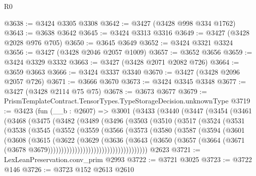 \begin{lexlean}{R0}
\begin{coremodule}
@3638 := @3424 @3305 @3308
@3642 := @3427 (@3428 @998 @334 @1762)
@3643 := @3638 @3642
@3645 := @3424 @3313 @3316
@3649 := @3427 (@3428 @2028 @976 @705)
@3650 := @3645 @3649
@3652 := @3424 @3321 @3324
@3656 := @3427 (@3428 @2046 @2057 @1009)
@3657 := @3652 @3656
@3659 := @3424 @3329 @3332
@3663 := @3427 (@3428 @2071 @2082 @726)
@3664 := @3659 @3663
@3666 := @3424 @3337 @3340
@3670 := @3427 (@3428 @2096 @2057 @726)
@3671 := @3666 @3670
@3673 := @3424 @3345 @3348
@3677 := @3427 (@3428 @2114 @75 @75)
@3678 := @3673 @3677
@3679 := PrismTemplateContract.TensorTypes.TypeStorageDecision.unknownType
@3719 := @3423
    (fun (__b : @2607) =>
    @3001
      (@3433
        (@3440
          (@3447
            (@3454
              (@3461
                (@3468
                  (@3475
                    (@3482
                      (@3489
                        (@3496
                          (@3503
                            (@3510
                              (@3517
                                (@3524
                                  (@3531
                                    (@3538
                                      (@3545
                                        (@3552
                                          (@3559
                                            (@3566
                                              (@3573
                                                (@3580
                                                  (@3587
                                                    (@3594
                                                      (@3601
                                                        (@3608
                                                          (@3615
                                                            (@3622
                                                              (@3629
                                                                (@3636
                                                                  (@3643
                                                                    (@3650
                                                                      (@3657
                                                                        (@3664
                                                                          (@3671
                                                                            (@3678
                                                                              @3679)))))))))))))))))))))))))))))))))))))
    @2623
@3721 := LexLeanPreservation.conv_prim @2993
@3722 := @3721 @3025
@3723 := @3722 @146
@3726 := @3723 @152 @2613 @2610

\end{coremodule}
\end{lexlean}
